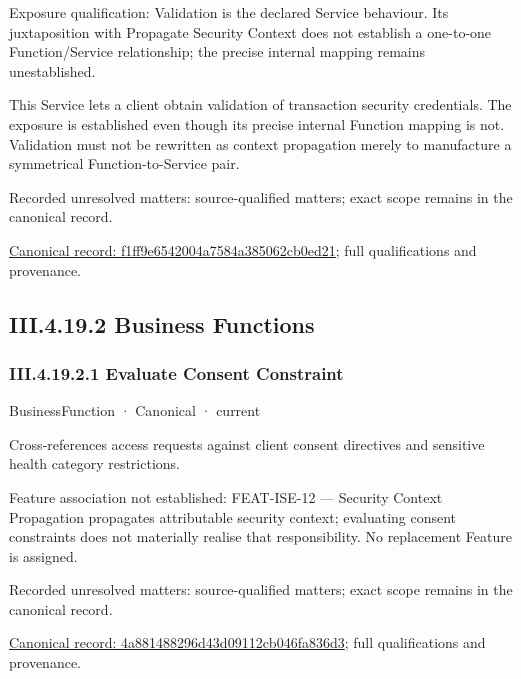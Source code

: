 Exposure qualification: Validation is the declared Service behaviour. Its juxtaposition with Propagate Security Context does not establish a one-to-one Function/Service relationship; the precise internal mapping remains unestablished.



This Service lets a client obtain validation of transaction security credentials. The exposure is established even though its precise internal Function mapping is not. Validation must not be rewritten as context propagation merely to manufacture a symmetrical Function-to-Service pair.


{\small Recorded unresolved matters: source-qualified matters; exact scope remains in the canonical record.}\par
{\footnotesize \href{../../../../continuum/business/business-service/f1ff9e6542004a7584a385062cb0ed21.md}{Canonical record: f1ff9e6542004a7584a385062cb0ed21}; full qualifications and provenance.}\par
\subsection*{III.4.19.2 Business Functions}
\label{navigation:III.4.19.2}

\subsubsection*{III.4.19.2.1 Evaluate Consent Constraint}
\label{navigation:III.4.19.2.1}

\label{element:4a881488296d43d09112cb046fa836d3}
{\small BusinessFunction · Canonical · current}\par

Cross-references access requests against client consent directives and sensitive health category restrictions.



Feature association not established: FEAT-ISE-12 — Security Context Propagation propagates attributable security context; evaluating consent constraints does not materially realise that responsibility. No replacement Feature is assigned.


{\small Recorded unresolved matters: source-qualified matters; exact scope remains in the canonical record.}\par
{\footnotesize \href{../../../../continuum/business/business-function/4a881488296d43d09112cb046fa836d3.md}{Canonical record: 4a881488296d43d09112cb046fa836d3}; full qualifications and provenance.}\par
